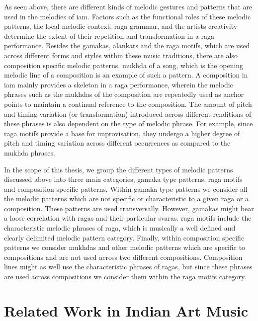 As seen above, there are different kinds of melodic gestures and patterns that are used in the melodies of \gls{iam}. Factors such as the functional roles of these melodic patterns, the local melodic context, \gls{raga} grammar, and the artists creativity determine the extent of their repetition and transformation in a \gls{raga} performance. Besides the \glspl{gamaka}, \glspl{alankar} and the \gls{raga} motifs, which are used across different forms and styles within these music traditions, there are also composition specific melodic patterns. \gls{mukhda} of a song, which is the opening melodic line of a composition is an example of such a pattern. A composition in \gls{iam} mainly provides a skeleton in a \gls{raga} performance, wherein the melodic phrases such as the \glspl{mukhda} of the composition are repeatedly used as anchor points to maintain a continual reference to the composition. The amount of pitch and timing variation (or transformation) introduced across different renditions of these phrases is also dependent on the type of melodic phrase. For example, since \gls{raga} motifs provide a base for improvisation, they undergo a higher degree of pitch and timing variation across different occurrences as compared to the \gls{mukhda} phrases.

In the scope of this thesis, we group the different types of melodic patterns discussed above into three main categories; \gls{gamaka} type patterns, \gls{raga} motifs and composition specific patterns. Within \gls{gamaka} type patterns we consider all the melodic patterns which are not specific or characteristic to a given \gls{raga} or a composition. These patterns are used transversally. However, \glspl{gamaka} might bear a loose correlation with  \glspl{raga} and their particular \glspl{svara}. \gls{raga} motifs include the characteristic melodic phrases of \gls{raga}, which is musically a well defined and clearly delimited melodic pattern category. Finally, within composition specific patterns we consider \glspl{mukhda} and other melodic patterns which are specific to compositions and are not used across two different compositions. Composition lines might as well use the characteristic phrases of \glspl{raga}, but since these phrases are used across compositions we consider them within the \gls{raga} motifs category. 


\section{Related Work in Indian Art Music}
\label{sec:background_relevant_work_iam}

